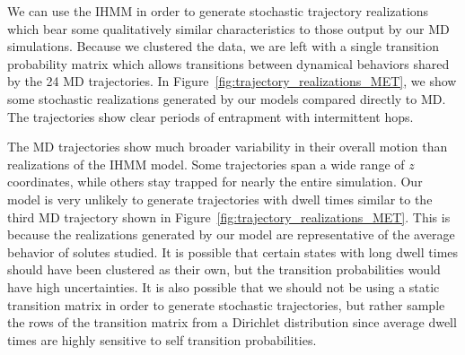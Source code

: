 \documentclass{article}
\begin{document}
  We can use the IHMM in order to generate stochastic trajectory realizations
  which bear some qualitatively similar characteristics to those output
  by our MD simulations. Because we clustered the data, we are left with a 
  single transition probability matrix which allows transitions between dynamical
  behaviors shared by the 24 MD trajectories. In 
  Figure~\ref{fig:trajectory_realizations_MET}, we show some stochastic realizations
  generated by our models compared directly to MD. The trajectories show clear 
  periods of entrapment with intermittent hops.
  
  The MD trajectories show much broader variability in their overall motion than realizations
  of the IHMM model. 
  Some trajectories span a wide range of $z$ coordinates, while others stay
  trapped for nearly the entire simulation. Our model is very unlikely to generate 
  trajectories with dwell times similar to the third MD trajectory shown in 
  Figure~\ref{fig:trajectory_realizations_MET}. This is because the realizations 
  generated by our model are representative of the average behavior of solutes studied.
  It is possible that certain states with long dwell times should have been
  clustered as their own, but the transition probabilities would have high uncertainties.
  It is also possible that we should not be using a static transition matrix in 
  order to generate stochastic trajectories, but rather sample the rows of the transition
  matrix from a Dirichlet distribution since average dwell times are highly sensitive to
  self transition probabilities.
\end{document}
